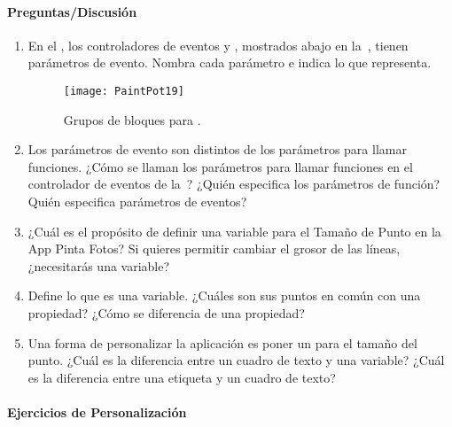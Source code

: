 \paragraph{Preguntas/Discusión}

\begin{enumerate}

\item En el , los controladores de eventos  y
, mostrados abajo en la~,
tienen parámetros de evento. Nombra cada parámetro e indica lo que
representa.

\begin{figure}[H]
\centering
\texttt{[image: PaintPot19]}
\caption{Grupos de bloques para .}
\label{fig:PaintPot19}
\end{figure}

\item Los parámetros de evento son distintos de los parámetros para llamar
funciones. ¿Cómo se llaman los parámetros para llamar funciones en el
controlador de eventos de la~? ¿Quién especifica
los parámetros de función? Quién especifica parámetros de eventos?

\item ¿Cuál es el propósito de definir una variable para el Tamaño de Punto
en la App Pinta Fotos? Si quieres permitir cambiar el grosor de las
líneas, ¿necesitarás una variable?

\item Define lo que es una variable. ¿Cuáles son sus puntos en común con una
propiedad? ¿Cómo se diferencia de una propiedad?

\item Una forma de personalizar la aplicación es poner un
   para el tamaño del punto. ¿Cuál es la
  diferencia entre un cuadro de texto y una variable? ¿Cuál es la
  diferencia entre una etiqueta y un cuadro de texto?

\end{enumerate}

\paragraph{Ejercicios de Personalización}

